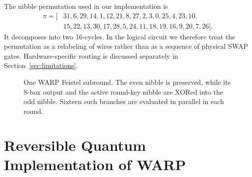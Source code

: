 \documentclass[pdflatex,sn-nature]{sn-jnl}
\newcommand{\Sb}{S_{b0}}
\theoremstyle{thmstyleone}
\theoremstyle{thmstyletwo}
\begin{document}
The nibble permutation used in our implementation is
\begin{align}
\pi = [&31,6,29,14,1,12,21,8,27,2,3,0,25,4,23,10,\nonumber\\
       &15,22,13,30,17,28,5,24,11,18,19,16,9,20,7,26].
\end{align}
It decomposes into two 16-cycles. In the logical circuit we therefore treat the permutation as a relabeling of wires rather than as a sequence of physical SWAP gates. Hardware-specific routing is discussed separately in Section~\ref{sec:limitations}.

\begin{figure}[tbp]
\centering
{}
\caption{One WARP Feistel subround. The even nibble is preserved, while its S-box output and the active round-key nibble are XORed into the odd nibble. Sixteen such branches are evaluated in parallel in each round.}
\label{fig:warp_subround}
\end{figure}

\section{Reversible Quantum Implementation of WARP}
\end{document}
